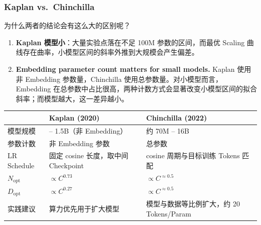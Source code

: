 \documentclass[
  11pt,
  a4paper,
  fontset=none]{ctexart}
\newcounter{none} %
\providecommand{\tightlist}{%
  \setlength{\itemsep}{0pt}\setlength{\parskip}{0pt}}
\begin{document}
\subsubsection{Kaplan vs.~Chinchilla}\label{kaplan-vs.-chinchilla}

为什么两者的结论会有这么大的区别呢？

\begin{enumerate}
\def\labelenumi{\arabic{enumi}.}
\tightlist
\item
  \textbf{Kaplan 模型小}：大量实验点落在不足 100M 参数的区间，而最优
  Scaling 曲线存在曲率，小模型区间的斜率外推到大规模会产生偏差。
\item
  \textbf{Embedding parameter count matters for small models.} Kaplan
  使用非 Embedding 参数量，Chinchilla
  使用总参数量。对小模型而言，Embedding
  在总参数中占比很高，两种计数方式会显著改变小模型区间的拟合斜率；而模型越大，这一差异越小。
\end{enumerate}

{\def\LTcaptype{none} %
\begin{longtable}[]{@{}
  >{\centering\arraybackslash}p{}
  >{\centering\arraybackslash}p{}
  >{\centering\arraybackslash}p{}@{}}
\toprule\noalign{}
\begin{minipage}[b]{\linewidth}\centering
\end{minipage} & \begin{minipage}[b]{\linewidth}\centering
\textbf{Kaplan (2020)}
\end{minipage} & \begin{minipage}[b]{\linewidth}\centering
\textbf{Chinchilla (2022)}
\end{minipage} \\
\midrule\noalign{}
\endhead
\bottomrule\noalign{}
\endlastfoot
模型规模 & 768 -- 1.5B（非 Embedding） & 约 70M -- 16B \\
参数计数 & 非 Embedding 参数 & 总参数 \\
LR Schedule & 固定 cosine 长度，取中间 Checkpoint & cosine
周期与目标训练 Tokens 匹配 \\
\(N_{\mathrm{opt}}\) & \(\propto C^{0.73}\) &
\(\propto C^{\approx0.5}\) \\
\(D_{\mathrm{opt}}\) & \(\propto C^{0.27}\) &
\(\propto C^{\approx0.5}\) \\
实践建议 & 算力优先用于扩大模型 & 模型与数据等比例扩大，约 20
Tokens/Param \\
\end{longtable}
}
\end{document}
